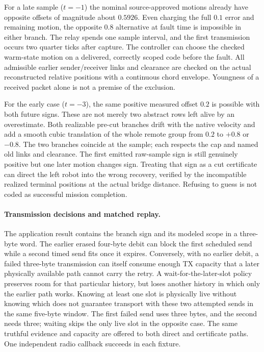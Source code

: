 \documentclass{article}
\begin{document}
For a late sample ($t=-1$) the nominal source-approved motions
already have opposite offsets of magnitude about $0.5926$.
Even charging the full $0.1$ error and remaining motion,
the opposite $0.8$ alternative at fault time is impossible
in either branch. The relay spends one sample interval,
and the first transmission occurs two quarter ticks after capture.
The controller can choose the checked warm-state motion on a
delivered, correctly scoped code before the fault.
All admissible earlier sender/receiver links and clearance are
checked on the actual reconstructed relative positions with a
continuous chord envelope. Youngness of a received packet alone
is not a premise of the exclusion.

For the early case ($t=-3$), the same positive measured offset
$0.2$ is possible with both future signs. These are not merely
two abstract rows left alive by an overestimate. Both realizable
pre-cut branches drift with the native velocity and add a smooth
cubic translation of the whole remote group from $0.2$ to
$+0.8$ or $-0.8$. The two branches coincide at the sample;
each respects the cap and named old links and clearance.
The first emitted raw-sample sign is still genuinely positive
but one later motion changes sign. Treating that sign as a
cut certificate can direct the left robot into the wrong
recovery, verified by the incompatible realized terminal
positions at the actual bridge distance. Refusing to guess is
not coded as successful mission completion.

\paragraph{Transmission decisions and matched replay.}
The application result contains the branch sign and its modeled
scope in a three-byte word. The earlier erased four-byte debit
can block the first scheduled send while a second timed send
fits once it expires. Conversely, with no earlier debit, a failed
three-byte transmission can itself consume enough TX capacity
that a later physically available path cannot carry the retry.
A wait-for-the-later-slot policy preserves room for that
particular history, but loses another history in which only
the earlier path works. Knowing at least one slot is physically
live without knowing which does not guarantee transport with
these two attempted sends in the same five-byte window.
The first failed send uses three bytes, and the second needs
three; waiting skips the only live slot in the opposite case.
The same truthful evidence and capacity are offered to both
direct and certificate paths. One independent radio callback
succeeds in each fixture.
\end{document}
